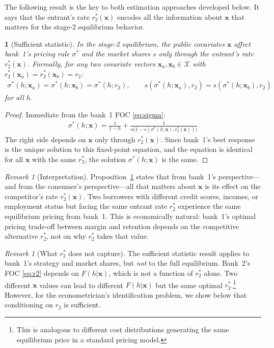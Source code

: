 \documentclass[12pt]{article}
\theoremstyle{plain}
\theoremstyle{plain}
\newtheorem{prop}[thm]{\protect\propositionname}
\theoremstyle{definition}  %
\theoremstyle{remark}  %
\newtheorem{remark}[thm]{Remark}  %
\providecommand{\propositionname}{Proposition}
\begin{document}
The following result is the key to both estimation approaches developed below. It says that the entrant's rate $r_2^*(\mathbf{x})$ encodes all the information about $\mathbf{x}$ that matters for the stage-2 equilibrium behavior.

\begin{prop}[Sufficient statistic]\label{prop:suffstat}
In the stage-2 equilibrium, the public covariates $\mathbf{x}$ affect bank~1's pricing rule $\sigma^*$ and the market shares $s$ only through the entrant's rate $r_2^*(\mathbf{x})$. Formally, for any two covariate vectors $\mathbf{x}_a, \mathbf{x}_b \in \mathcal{X}$ with $r_2^*(\mathbf{x}_a) = r_2^*(\mathbf{x}_b) = r_2$:
\begin{align}\label{eq:suffstat}
    \sigma^*(h; \mathbf{x}_a) = \sigma^*(h; \mathbf{x}_b) = \sigma^*(h; r_2), \qquad s(\sigma^*(h; \mathbf{x}_a), r_2) = s(\sigma^*(h; \mathbf{x}_b), r_2)
\end{align}
for all $h$.
\end{prop}

\begin{proof}
Immediate from the bank~1 FOC \eqref{eq:sigma}:
\begin{align*}
    \sigma^*(h; \mathbf{x}) = \frac{1}{1-h} + \frac{1}{\alpha\big(1-s(\sigma^*(h;\mathbf{x}), r_2^*(\mathbf{x}))\big)}
\end{align*}
The right side depends on $\mathbf{x}$ only through $r_2^*(\mathbf{x})$. Since bank~1's best response is the unique solution to this fixed-point equation, and the equation is identical for all $\mathbf{x}$ with the same $r_2^*$, the solution $\sigma^*(h; \mathbf{x})$ is the same.
\end{proof}

\begin{remark}[Interpretation]\label{rem:suffstat_interp}
Proposition~\ref{prop:suffstat} states that from bank~1's perspective---and from the consumer's perspective---all that matters about $\mathbf{x}$ is its effect on the competitor's rate $r_2^*(\mathbf{x})$. Two borrowers with different credit scores, incomes, or employment status but facing the same entrant rate $r_2^*$ experience the same equilibrium pricing from bank~1. This is economically natural: bank~1's optimal pricing trade-off between margin and retention depends on the competitive alternative $r_2^*$, not on why $r_2^*$ takes that value.
\end{remark}

\begin{remark}[What $r_2^*$ does not capture]\label{rem:suffstat_limit}
The sufficient statistic result applies to bank~1's strategy and market shares, but \emph{not} to the full equilibrium. Bank~2's FOC \eqref{eq:r2} depends on $F(h|\mathbf{x})$, which is not a function of $r_2^*$ alone. Two different $\mathbf{x}$ values can lead to different $F(h|\mathbf{x})$ but the same optimal $r_2^*$.\footnote{This is analogous to different cost distributions generating the same equilibrium price in a standard pricing model.} However, for the econometrician's identification problem, we show below that conditioning on $r_2$ is sufficient.
\end{remark}
\end{document}
